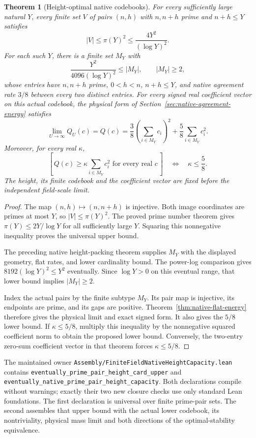 \documentclass[11pt]{article}
\newtheorem{theorem}{Theorem}[section]
\begin{document}
\begin{theorem}[Height-optimal native codebooks]
\label{thm:native-height-capacity}
For every sufficiently large natural \(Y\), every finite set \(V\) of
pairs \((n,h)\) with \(n,n+h\) prime and \(n+h\le Y\) satisfies
\[
 |V|\le \pi(Y)^2\le \frac{4Y^2}{(\log Y)^2}.
\]
For each such \(Y\), there is a finite set \(M_Y\) with
\[
 \frac{Y^2}{4096(\log Y)^2}\le |M_Y|,
 \qquad |M_Y|\ge2,
\]
whose entries have \(n,n+h\) prime, \(0<h<n\), \(n+h\le Y\), and
native agreement rate \(3/8\) between every two distinct entries.
For every signed real coefficient vector on this actual codebook,
the physical form of Section~\ref{sec:native-agreement-energy} satisfies
\[
 \lim_{U\to\infty} Q_U(c)
 =Q(c)=\frac38\left(\sum_{i\in M_Y}c_i\right)^2
        +\frac58\sum_{i\in M_Y}c_i^2 .
\]
Moreover, for every real \(\kappa\),
\[
 \left[\,Q(c)\ge\kappa\sum_{i\in M_Y}c_i^2
             \text{ for every real }c\,\right]
       \quad\Longleftrightarrow\quad \kappa\le\frac58.
\]
The height, its finite codebook and the coefficient vector are fixed
before the independent field-scale limit.
\end{theorem}

\begin{proof}
The map \((n,h)\mapsto(n,n+h)\) is injective. Both image coordinates
are primes at most \(Y\), so \(|V|\le\pi(Y)^2\).
The proved prime number theorem gives
\(\pi(Y)\le2Y/\log Y\) for all sufficiently large \(Y\).
Squaring this nonnegative inequality proves the universal upper bound.

The preceding native height-packing theorem supplies \(M_Y\) with
the displayed geometry, flat rates, and lower cardinality bound.
The power-log comparison gives
\(8192(\log Y)^2\le Y^2\) eventually. Since \(\log Y>0\) on this
eventual range, that lower bound implies \(|M_Y|\ge2\).

Index the actual pairs by the finite subtype \(M_Y\).
Its pair map is injective, its endpoints are prime, and its gaps
are positive. Theorem~\ref{thm:native-flat-energy} therefore gives
the physical limit and exact signed form. It also gives the
\(5/8\) lower bound. If \(\kappa\le5/8\), multiply this inequality
by the nonnegative squared coefficient norm to obtain the proposed
lower bound. Conversely, the two-entry zero-sum coefficient vector
in that theorem forces \(\kappa\le5/8\).
\end{proof}

The maintained owner
\texttt{Assembly/\allowbreak FiniteFieldNativeHeightCapacity.\allowbreak lean}
contains
\texttt{eventually\_prime\_pair\_height\_card\_upper} and
\texttt{eventually\_native\_prime\_pair\_height\_capacity}.
Both declarations compile without warnings; exactly their two new
closure checks use only standard Lean foundations.
The first declaration is universal over finite prime-pair sets.
The second assembles that upper bound with the actual lower codebook,
its nontriviality, physical mass limit and both directions of the
optimal-stability equivalence.
\end{document}
